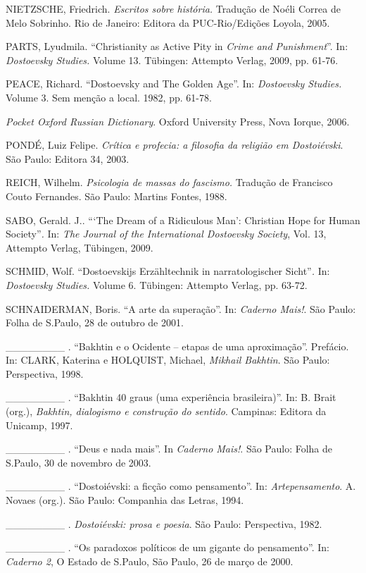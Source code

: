 NIETZSCHE, Friedrich. \emph{Escritos sobre história.} Tradução de Noéli
Correa de Melo Sobrinho. Rio de Janeiro: Editora da PUC-Rio/Edições
Loyola, 2005.

PARTS, Lyudmila. ``Christianity as Active Pity in \emph{Crime and
Punishment}''. In: \emph{Dostoevsky Studies.} Volume 13. Tübingen:
Attempto Verlag, 2009, pp. 61-76.

PEACE, Richard. ``Dostoevsky and The Golden Age''. In: \emph{Dostoevsky
Studies.} Volume 3. Sem menção a local. 1982, pp. 61-78.

\emph{Pocket Oxford Russian Dictionary}. Oxford University Press, Nova
Iorque, 2006.

PONDÉ, Luiz Felipe. \emph{Crítica e profecia: a filosofia da religião em
Dostoiévski}. São Paulo: Editora 34, 2003.

REICH, Wilhelm. \emph{Psicologia de massas do fascismo.} Tradução de
Francisco Couto Fernandes. São Paulo: Martins Fontes, 1988.

SABO, Gerald. J.. ```The Dream of a Ridiculous Man': Christian Hope for
Human Society''\emph{.} In: \emph{The Journal of the International
Dostoevsky Society}, Vol. 13, Attempto Verlag, Tübingen, 2009.

SCHMID, Wolf. ``Dostoevskijs Erzähltechnik in narratologischer
Sicht''\emph{.} In: \emph{Dostoevsky Studies.} Volume 6. Tübingen:
Attempto Verlag, pp. 63-72.

SCHNAIDERMAN, Boris. ``A arte da superação''. In: \emph{Caderno Mais!}.
São Paulo: Folha de S.Paulo, 28 de outubro de 2001.

\_\_\_\_\_\_\_\_ . ``Bakhtin e o Ocidente -- etapas de uma
aproximação''. Prefácio. In: CLARK, Katerina e HOLQUIST, Michael,
\emph{Mikhail Bakhtin}. São Paulo: Perspectiva, 1998.

\_\_\_\_\_\_\_\_ . ``Bakhtin 40 graus (uma experiência brasileira)''.
In: B. Brait (org.), \emph{Bakhtin, dialogismo e construção do sentido}.
Campinas: Editora da Unicamp, 1997.

\_\_\_\_\_\_\_\_ . ``Deus e nada mais''. In \emph{Caderno Mais!}. São
Paulo: Folha de S.Paulo, 30 de novembro de 2003.

\_\_\_\_\_\_\_\_ . ``Dostoiévski: a ficção como pensamento''. In:
\emph{Artepensamento}. A. Novaes (org.). São Paulo: Companhia das
Letras, 1994.

\_\_\_\_\_\_\_\_ . \emph{Dostoiévski: prosa e poesia}. São Paulo:
Perspectiva, 1982.

\_\_\_\_\_\_\_\_ . ``Os paradoxos políticos de um gigante do
pensamento''. In: \emph{Caderno 2}, O Estado de S.Paulo, São Paulo, 26
de março de 2000.

